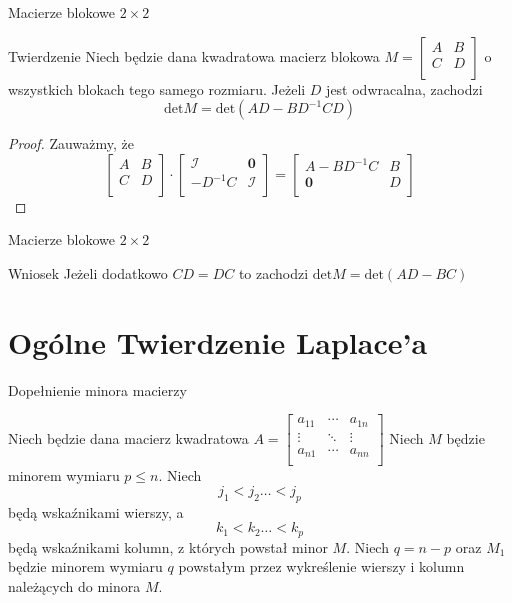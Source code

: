 \documentclass{beamer}
\newcommand{\zero}{\mathbf{0}}
\newcommand{\id}{\mathcal{I}}
\renewcommand{\det}{\textrm{det}}
\begin{document}
\begin{frame}{Macierze  blokowe $2 \times 2 $}
    \begin{block}{Twierdzenie}
        Niech będzie dana kwadratowa macierz blokowa $M = \begin{bmatrix}
            A & B \\ C & D \\  
        \end{bmatrix}$
        o wszystkich blokach tego samego rozmiaru. Jeżeli $D$ jest odwracalna, zachodzi 
        $$\det M = \det(AD - BD^{-1}CD)$$
    \end{block}    
    \pause 
    \begin{proof}
        Zauważmy, że 
        $$ \begin{bmatrix}
            A & B \\ C & D \\
        \end{bmatrix}
        \cdot \begin{bmatrix}
            \id & \zero \\ - D^{-1} C & \id  \\
        \end{bmatrix}
        = \begin{bmatrix}
            A - B D^{-1}C & B \\ \zero & D \\  
        \end{bmatrix}
        $$
    \end{proof}
\end{frame}

\begin{frame}{Macierze blokowe $2 \times 2$}
            \begin{alertblock}{Wniosek}
                Jeżeli dodatkowo $CD = DC$ to zachodzi $\det M = \det(AD - BC)$
            \end{alertblock}
\end{frame}

\section{Ogólne Twierdzenie  Laplace'a}

\begin{frame}{Dopełnienie minora macierzy}

    Niech będzie dana macierz kwadratowa $A = \begin{bmatrix}
        a_{11} & \cdots  & a_{1n} \\ 
        \vdots & \ddots & \vdots \\ 
        a_{n1} & \cdots & a_{nn} \\
    \end{bmatrix}$ 
    Niech $M$ będzie minorem wymiaru $p \leq n$.
    Niech $$ j_1 < j_2 \ldots < j_p $$ będą wskaźnikami wierszy, a 
    $$ k_1 < k_2 \ldots < k_p$$ będą wskaźnikami kolumn, z których powstał minor $M$.
    Niech $q = n-p$ oraz $M_1$ będzie minorem wymiaru $q$ powstałym przez wykreślenie wierszy i kolumn należących do minora $M$.
\end{frame}
\end{document}
